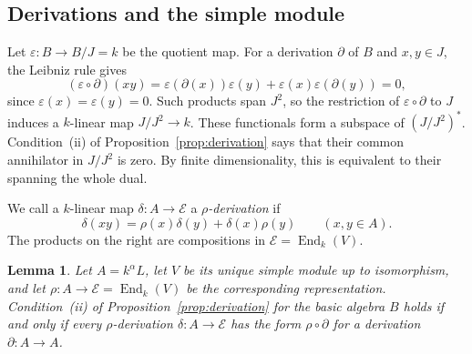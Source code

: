 \documentclass[11pt,a4paper]{article}
\newtheorem{lemma}[theorem]{Lemma}
\theoremstyle{definition}
\theoremstyle{remark}
\numberwithin{equation}{section}
\DeclareMathOperator{\End}{End}
\begin{document}
	\subsection{Derivations and the simple module}
	
	Let $\varepsilon:B\to B/J=k$ be the quotient map. For a derivation $\partial$
	of $B$ and $x,y\in J$, the Leibniz rule gives
	\[
	(\varepsilon\circ\partial)(xy)
	=\varepsilon(\partial(x))\varepsilon(y)+\varepsilon(x)\varepsilon(\partial(y))=0,
	\]
	since $\varepsilon(x)=\varepsilon(y)=0$. Such products span $J^2$, so the
	restriction of $\varepsilon\circ\partial$ to $J$ induces a $k$-linear map $J/J^2\to k$.
	These functionals form a subspace of $(J/J^2)^*$. Condition~(ii) of
	Proposition~\ref{prop:derivation} says that their common annihilator in $J/J^2$ is zero.
	By finite dimensionality, this is equivalent to their spanning the whole dual.
	
	We call a $k$-linear map $\delta:A\to \mathcal{E}$ a \emph{$\rho$-derivation} if
	\[
	\delta(xy)=\rho(x)\delta(y)+\delta(x)\rho(y)\qquad(x,y\in A).
	\]
	The products on the right are compositions in $\mathcal{E}=\End_k(V)$.
	
	\begin{lemma}\label{lem:lift-derivation}
		Let $A=k^\alpha L$, let $V$ be its unique simple module up to isomorphism,
		and let $\rho:A\to \mathcal{E}=\End_k(V)$ be the corresponding representation.
		Condition~(ii) of Proposition~\ref{prop:derivation} for the basic algebra $B$
		holds if and only if every $\rho$-derivation $\delta:A\to \mathcal{E}$ has the form
		$\rho\circ\partial$ for a derivation $\partial:A\to A$.
	\end{lemma}
	
\end{document}
